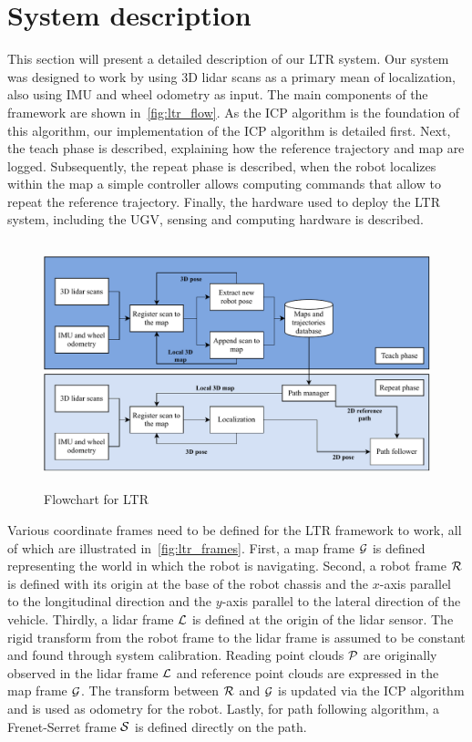 \section{System description}
\label{sec:sys}

This section will present a detailed description of our \ac{LTR} system.
Our system was designed to work by using 3D lidar scans as a primary mean of localization, also using \ac{IMU} and wheel odometry as input.
The main components of the framework are shown in~\autoref{fig:ltr_flow}.
As the \ac{ICP} algorithm is the foundation of this algorithm, our implementation of the \ac{ICP} algorithm is detailed first.
Next, the teach phase is described, explaining how the reference trajectory and map are logged.
Subsequently, the repeat phase is described, when the robot localizes within the map a simple controller allows computing commands that allow to repeat the reference trajectory.
Finally, the hardware used to deploy the \ac{LTR} system, including the \ac{UGV}, sensing and computing hardware is described.

\begin{figure} [h!]
	\centering
	\includegraphics[height=2.8in]{figs/LTR_flowchart.pdf}
	\caption{Flowchart for LTR}
	\label{fig:ltr_flow}
\end{figure}

Various coordinate frames need to be defined for the \ac{LTR} framework to work, all of which are illustrated in~\autoref{fig:ltr_frames}.
First, a map frame $\mathcal{G}$ is defined representing the world in which the robot is navigating.
Second, a robot frame $\mathcal{R}$ is defined with its origin at the base of the robot chassis and the $x$-axis parallel to the longitudinal direction and the $y$-axis parallel to the lateral direction of the vehicle.
Thirdly, a lidar frame $\mathcal{L}$ is defined at the origin of the lidar sensor.
The rigid transform from the robot frame to the lidar frame \transform{\robotf}{\lidarf} is assumed to be constant and found through system calibration.
Reading point clouds $\mathcal{P}$ are originally observed in the lidar frame $\mathcal{L}$ and reference point clouds are expressed in the map frame $\mathcal{G}$.
The transform between $\mathcal{R}$ and $\mathcal{G}$ \transform{\robotf}{\mapf} is updated via the \ac{ICP} algorithm and is used as odometry for the robot.
Lastly, for path following algorithm, a Frenet-Serret frame $\mathcal{S}$ is defined directly on the path.

